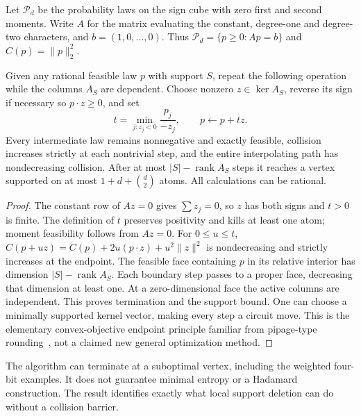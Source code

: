 
Let $\mathcal P_d$ be the probability laws on the sign cube with
zero first and second moments. Write $A$ for the matrix evaluating
the constant, degree-one and degree-two characters, and $b=(1,0,\ldots,0)$.
Thus $\mathcal P_d=\{p\ge0:Ap=b\}$ and $C(p)=\|p\|_2^2$.

\begin{theorem}
Given any rational feasible law $p$ with support $S$, repeat the
following operation while the columns $A_S$ are dependent.
Choose nonzero $z\in\ker A_S$, reverse its sign if necessary so
$p\cdot z\ge0$, and set
\[
 t=\min_{j:z_j<0}\frac{p_j}{-z_j},\qquad p\leftarrow p+tz.
\]
Every intermediate law remains nonnegative and exactly feasible,
collision increases strictly at each nontrivial step, and the entire
interpolating path has nondecreasing collision. After at most
$|S|-\operatorname{rank}A_S$ steps it reaches a vertex supported on
at most $1+d+\binom d2$ atoms. All calculations can be rational.
\end{theorem}
\begin{proof}
The constant row of $Az=0$ gives $\sum z_j=0$, so $z$ has both
signs and $t>0$ is finite. The definition of $t$ preserves positivity
and kills at least one atom; moment feasibility follows from $Az=0$.
For $0\le u\le t$,
$C(p+uz)=C(p)+2u(p\cdot z)+u^2\|z\|^2$ is nondecreasing and
strictly increases at the endpoint. The feasible face containing
$p$ in its relative interior has dimension
$|S|-\operatorname{rank}A_S$. Each boundary step passes to a proper
face, decreasing that dimension at least one. At a zero-dimensional
face the active columns are independent. This proves termination
and the support bound. One can choose a minimally supported kernel
vector, making every step a circuit move. This is the elementary
convex-objective endpoint principle familiar from pipage-type
rounding~\cite{s24:AS}, not a claimed new general optimization method.
\end{proof}
The algorithm can terminate at a suboptimal vertex, including the
weighted four-bit examples. It does not guarantee minimal entropy
or a Hadamard construction. The result identifies exactly what local
support deletion can do without a collision barrier.

